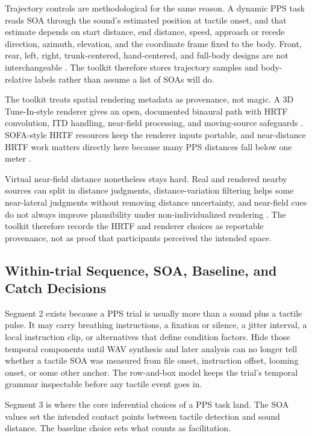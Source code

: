 \documentclass[pdflatex,sn-apa]{sn-jnl}
\begin{document}
Trajectory controls are methodological for the same reason. A dynamic PPS task reads SOA through the sound's estimated position at tactile onset, and that estimate depends on start distance, end distance, speed, approach or recede direction, azimuth, elevation, and the coordinate frame fixed to the body. Front, rear, left, right, trunk-centered, hand-centered, and full-body designs are not interchangeable \citep{Matsuda2021,Teraoka2024,Amiel2025,Serino2015,Noel2015}. The toolkit therefore stores trajectory samples and body-relative labels rather than assume a list of SOAs will do.

The toolkit treats spatial rendering metadata as provenance, not magic. A 3D Tune-In-style renderer gives an open, documented binaural path with HRTF convolution, ITD handling, near-field processing, and moving-source safeguards \citep{CuevasRodriguez2019}. SOFA-style HRTF resources keep the renderer inputs portable, and near-distance HRTF work matters directly here because many PPS distances fall below one meter \citep{Salvador2018}.

Virtual near-field distance nonetheless stays hard. Real and rendered nearby sources can split in distance judgments, distance-variation filtering helps some near-lateral judgments without removing distance uncertainty, and near-field cues do not always improve plausibility under non-individualized rendering \citep{Parseihian2014,Kan2009,Spagnol2017,Arend2021}. The toolkit therefore records the HRTF and renderer choices as reportable provenance, not as proof that participants perceived the intended space.

\subsection{Within-trial Sequence, SOA, Baseline, and Catch Decisions}

Segment 2 exists because a PPS trial is usually more than a sound plus a tactile pulse. It may carry breathing instructions, a fixation or silence, a jitter interval, a local instruction clip, or alternatives that define condition factors. Hide those temporal components until WAV synthesis and later analysis can no longer tell whether a tactile SOA was measured from file onset, instruction offset, looming onset, or some other anchor. The row-and-box model keeps the trial's temporal grammar inspectable before any tactile event goes in.

Segment 3 is where the core inferential choices of a PPS task land. The SOA values set the intended contact points between tactile detection and sound distance. The baseline choice sets what counts as facilitation.
\end{document}
